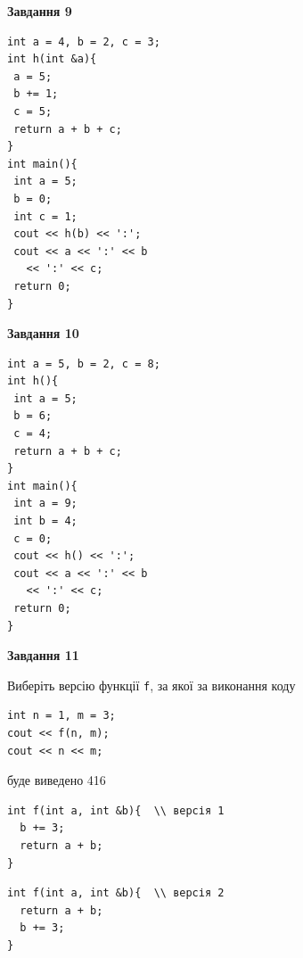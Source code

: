 \documentclass[12pt, ukrainian]{article}
\def\code#1{\Verb!#1!}
\begin{document}
{\begin {large}
\begin{minipage}[t]{11.0cm}
\end{minipage}


\begin{minipage}[t]{7.0cm}

\begin{center}
\textbf{Завдання 9}
\end{center}
\vspace{-8mm}

\begin{verbatim}
int a = 4, b = 2, c = 3;
int h(int &a){
 a = 5;
 b += 1;
 c = 5;
 return a + b + c;
}
int main(){
 int a = 5;
 b = 0;
 int c = 1;
 cout << h(b) << ':';
 cout << a << ':' << b 
   << ':' << c;
 return 0;
}
\end{verbatim}



\begin{center}
\textbf{Завдання 10}
\end{center}
\vspace{-8mm}

\begin{verbatim}
int a = 5, b = 2, c = 8;
int h(){
 int a = 5;
 b = 6;
 c = 4;
 return a + b + c;
}
int main(){
 int a = 9;
 int b = 4;
 c = 0;
 cout << h() << ':';
 cout << a << ':' << b 
   << ':' << c;
 return 0;
}
\end{verbatim}

\end{minipage}
\vline \hspace{1mm}
\begin{minipage}[t]{11.0cm}

\begin{center}
\textbf{Завдання 11}
\end{center}
Виберіть версію функції \code{f}, за якої за виконання коду
\begin{verbatim}
int n = 1, m = 3;
cout << f(n, m);
cout << n << m;
\end{verbatim}

буде виведено 416

\begin{verbatim}
int f(int a, int &b){  \\ версія 1
  b += 3;
  return a + b;
}
\end{verbatim}

\vspace{-8mm}\begin{verbatim}
int f(int a, int &b){  \\ версія 2
  return a + b;
  b += 3;
}
\end{verbatim}


\end{minipage}
\end{large}}
\end{document}
